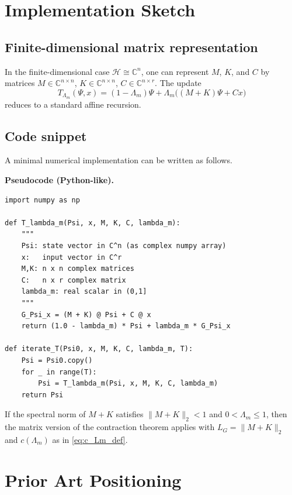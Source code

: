 \documentclass[11pt]{article}
\begin{document}
\section{Implementation Sketch}

\subsection{Finite-dimensional matrix representation}

In the finite-dimensional case $\mathcal{H} \cong \mathbb{C}^{n}$, one can represent $M$, $K$, and $C$ by matrices $M \in \mathbb{C}^{n \times n}$, $K \in \mathbb{C}^{n \times n}$, $C \in \mathbb{C}^{n \times r}$. The update
\begin{equation}
  T_{\Lambda_m}(\Psi,x) = (1 - \Lambda_m)\Psi + \Lambda_m\bigl((M+K)\Psi + Cx\bigr)
\end{equation}
reduces to a standard affine recursion.

\subsection{Code snippet}

A minimal numerical implementation can be written as follows.

\medskip

\noindent
\textbf{Pseudocode (Python-like).}
\begin{verbatim}
import numpy as np

def T_lambda_m(Psi, x, M, K, C, lambda_m):
    """
    Psi: state vector in C^n (as complex numpy array)
    x:   input vector in C^r
    M,K: n x n complex matrices
    C:   n x r complex matrix
    lambda_m: real scalar in (0,1]
    """
    G_Psi_x = (M + K) @ Psi + C @ x
    return (1.0 - lambda_m) * Psi + lambda_m * G_Psi_x

def iterate_T(Psi0, x, M, K, C, lambda_m, T):
    Psi = Psi0.copy()
    for _ in range(T):
        Psi = T_lambda_m(Psi, x, M, K, C, lambda_m)
    return Psi
\end{verbatim}

If the spectral norm of $M+K$ satisfies $\|M+K\|_2 < 1$ and $0 < \Lambda_m \leq 1$, then the matrix version of the contraction theorem applies with $L_G = \|M+K\|_2$ and $c(\Lambda_m)$ as in \eqref{eq:c_Lm_def}.

\section{Prior Art Positioning}
\end{document}
